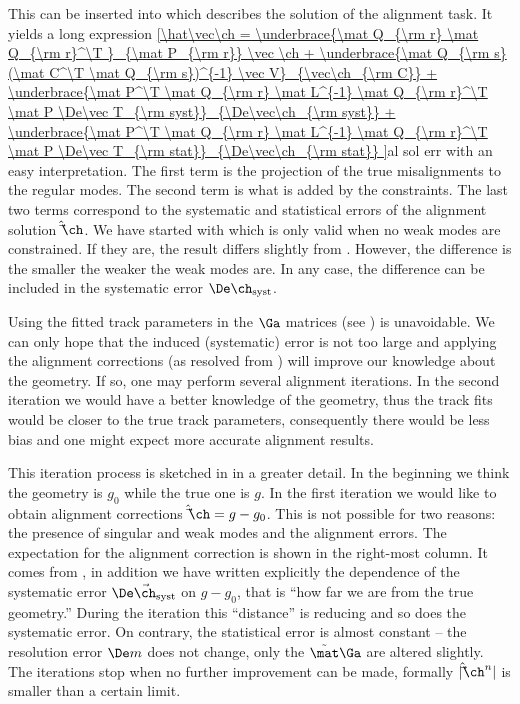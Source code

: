 This can be inserted into  which describes the solution of the alignment task. It yields a long expression
\eqref{\hat\vec\ch =
	\underbrace{\mat Q_{\rm r} \mat Q_{\rm r}^\T }_{\mat P_{\rm r}} \vec \ch
	+ \underbrace{\mat Q_{\rm s} (\mat C^\T \mat Q_{\rm s})^{-1} \vec V}_{\vec\ch_{\rm C}}
	+ \underbrace{\mat P^\T \mat Q_{\rm r} \mat L^{-1} \mat Q_{\rm r}^\T \mat P \De\vec T_{\rm syst}}_{\De\vec\ch_{\rm syst}}
	+ \underbrace{\mat P^\T \mat Q_{\rm r} \mat L^{-1} \mat Q_{\rm r}^\T \mat P \De\vec T_{\rm stat}}_{\De\vec\ch_{\rm stat}}
}{al sol err}
with an easy interpretation. The first term is the projection of the true misalignments to the regular modes. The second term is what is added by the constraints. The last two terms correspond to the systematic and statistical errors of the alignment solution $\hat\vec\ch$. We have started with  which is only valid when no weak modes are constrained. If they are, the result differs slightly from . However, the difference is the smaller the weaker the weak modes are. In any case, the difference can be included in the systematic error $\De\ch_{\rm syst}$.

Using the fitted track parameters in the $\Ga$ matrices (see ) is unavoidable. We can only hope that the induced (systematic) error is not too large and applying the alignment corrections (as resolved from ) will improve our knowledge about the geometry. If so, one may perform several alignment iterations. In the second iteration we would have a better knowledge of the geometry, thus the track fits would be closer to the true track parameters, consequently there would be less bias and one might expect more accurate alignment results.

This iteration process is sketched in  in a greater detail. In the beginning we think the geometry is $g_0$ while the true one is $g$. In the first iteration we would like to obtain alignment corrections $\hat\vec\ch = g - g_0$. This is not possible for two reasons: the presence of singular and weak modes and the alignment errors. The expectation for the alignment correction is shown in the right-most column. It comes from , in addition we have written explicitly the dependence of the systematic error $\De\vec\ch_{\rm syst}$ on $g - g_0$, that is ``how far we are from the true geometry.'' During the iteration this ``distance'' is reducing and so does the systematic error. On contrary, the statistical error is almost constant -- the resolution error $\De m$ does not change, only the $\tilde\mat\Ga$ are altered slightly. The iterations stop when no further improvement can be made, formally $|\hat\vec\ch^n|$ is smaller than a certain limit.

